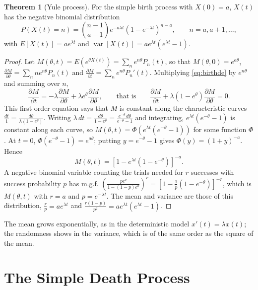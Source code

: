 \documentclass[12pt,a4paper]{report}
\theoremstyle{definition}
\newtheorem{thm}{Theorem}[section]
\DeclareMathOperator{\var}{var}
\begin{document}
\begin{thm}[Yule process]
\label{thm:yule}
For the simple birth process with $X(0) = a$, $X(t)$ has the negative binomial distribution
\[P(X(t) = n) = \binom{n - 1}{a - 1}e^{-a\lambda t}\left(1 - e^{-\lambda t}\right)^{n - a},\qquad n = a, a + 1, \dots,\]
with $E\left[X(t)\right] = ae^{\lambda t}$ and $\var\left[X(t)\right] = ae^{\lambda t}\left(e^{\lambda t} - 1\right)$.
\end{thm}

\begin{proof}
Let $M(\theta, t) = E\left(e^{\theta X(t)}\right) = \sum_ne^{n\theta}P_n(t)$, so that $M(\theta, 0) = e^{a\theta}$,
$\frac{\partial M}{\partial\theta} = \sum_nne^{n\theta}P_n(t)$ and $\frac{\partial M}{\partial t} = \sum_ne^{n\theta}P_n'(t)$.
Multiplying \eqref{eq:birthde} by $e^{n\theta}$ and summing over $n$,
\[\frac{\partial M}{\partial t} = -\lambda\frac{\partial M}{\partial\theta} + \lambda e^\theta\frac{\partial M}{\partial\theta},
\qquad\text{that is}\qquad
\frac{\partial M}{\partial t} + \lambda(1 - e^\theta)\frac{\partial M}{\partial\theta} = 0 .\]
This first-order equation says that $M$ is constant along the characteristic curves
$\frac{dt}{1} = \frac{d\theta}{\lambda(1 - e^\theta)}$. Writing $\lambda\,dt = \frac{d\theta}{1 - e^\theta} = \frac{e^{-\theta}\,d\theta}{e^{-\theta} - 1}$
and integrating, $e^{\lambda t}(e^{-\theta} - 1)$ is constant along each curve, so
$M(\theta, t) = \Phi\left(e^{\lambda t}(e^{-\theta} - 1)\right)$ for some function $\Phi$. At $t = 0$,
$\Phi(e^{-\theta} - 1) = e^{a\theta}$; putting $y = e^{-\theta} - 1$ gives $\Phi(y) = (1 + y)^{-a}$. Hence
\[M(\theta, t) = \left[1 - e^{\lambda t}\left(1 - e^{-\theta}\right)\right]^{-a} .\]
A negative binomial variable counting the trials needed for $r$ successes with success
probability $p$ has m.g.f. $\left(\frac{pe^\theta}{1 - (1 - p)e^\theta}\right)^r = \left[1 - \frac1p(1 - e^{-\theta})\right]^{-r}$,
which is $M(\theta, t)$ with $r = a$ and $p = e^{-\lambda t}$. The mean and variance are those of this
distribution, $\frac rp = ae^{\lambda t}$ and $\frac{r(1 - p)}{p^2} = ae^{\lambda t}(e^{\lambda t} - 1)$.
\end{proof}

The mean grows exponentially, as in the deterministic model $x'(t) = \lambda x(t)$; the randomness
shows in the variance, which is of the same order as the square of the mean.

\section{The Simple Death Process}
\end{document}
